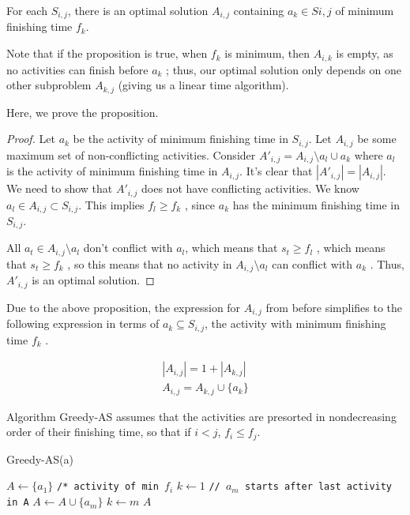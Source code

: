 \documentclass [12pt]{article}
\theoremstyle{definition}
\begin{document}
\begin{proposition}For each $S_{i ,j}$, there is an optimal solution $A_{i ,j}$ containing $a_k \in Si ,j$ of minimum finishing time $f_k$.
\end{proposition}
 

Note that if the proposition is true, when $f_k$ is minimum, then $A_{i ,k}$ is empty, as no activities can finish before $a_k$ ; thus, our optimal solution only depends on one other subproblem $A_{k ,j}$ (giving us a linear time algorithm). 


Here, we prove the proposition.

\begin{proof}

Let $a_k$ be the activity of minimum finishing time in $S_{i ,j}$. Let $A_{i ,j}$ be some maximum set of non-conflicting activities. Consider $A'_{i ,j} = A_{i ,j} \setminus {a_l} \cup {a_k}$ where $a_l$ is the activity of minimum finishing time in $A_{i ,j}$. It’s clear that $|A'_{i ,j}| = |A_{i ,j}|$. We need to show that $A'_{i ,j}$ does not have conflicting activities. We know $a_l \in A_{i ,j} \subset S_{i ,j}$. This implies $f_l \geq f_k$ , since $a_k$ has the minimum finishing time in $S_{i ,j}$. 

All $a_t \in A_{i ,j} \setminus {a_l}$ don’t conflict with $a_l $, which means that $s_t \geq f_l$ , which means that $s_t \geq f_k$ , so this means that no activity in $A_{i ,j} \setminus {a_l}$ can conflict with $a_k$ . Thus, $A'_{i ,j}$ is an optimal solution.
\end{proof}

Due to the above proposition, the expression for $A_{i ,j}$ from before simplifies to the following
expression in terms of $a_k \subseteq S_{i ,j}$, the activity with minimum finishing time $f_k$ .

\begin{align*}
|A_{i,j}| = 1 + |A_{k,j}| \\
A_{i,j} = A_{k,j} \cup \{a_k \}
\end{align*}

Algorithm Greedy-AS assumes that the activities are presorted in nondecreasing order of their finishing time, so that if $i < j$, $f_i \leq f_j$.

\begin{algorithm}
\caption{Greedy-AS(a)}
\label{alg:greed_as}
\begin{algorithmic}
\State $A \gets \{a_1\}$ \texttt{/* activity of min $f_i$}
\State $k \gets 1$
        \State \texttt{// $a_m$ starts after last activity in A}
        \State $A \gets A \cup \{a_m\}$
        \State $k \gets m$
    \EndIf
\EndFor
\Return $A$
\end{algorithmic}
\end{algorithm}
\end{document}
